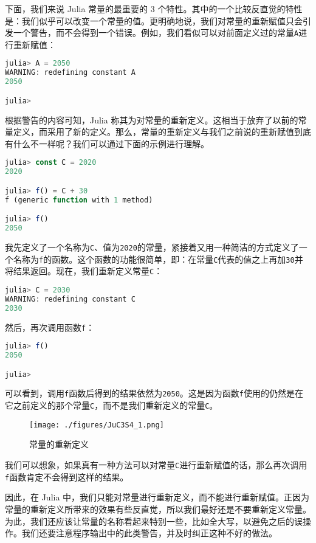 下面，我们来说 Julia 常量的最重要的 3 个特性。其中的一个比较反直觉的特性是：我们似乎可以改变一个常量的值。更明确地说，我们对常量的重新赋值只会引发一个警告，而不会得到一个错误。例如，我们看似可以对前面定义过的常量\verb|A|进行重新赋值：

\begin{lstlisting}[language=julia]
julia> A = 2050
WARNING: redefining constant A
2050

julia> 
\end{lstlisting}

根据警告的内容可知，Julia 称其为对常量的重新定义。这相当于放弃了以前的常量定义，而采用了新的定义。那么，常量的重新定义与我们之前说的重新赋值到底有什么不一样呢？我们可以通过下面的示例进行理解。

\begin{lstlisting}[language=julia]
julia> const C = 2020 
2020

julia> f() = C + 30
f (generic function with 1 method)

julia> f()
2050
\end{lstlisting}

我先定义了一个名称为\verb|C|、值为\verb|2020|的常量，紧接着又用一种简洁的方式定义了一个名称为\verb|f|的函数。这个函数的功能很简单，即：在常量\verb|C|代表的值之上再加\verb|30|并将结果返回。现在，我们重新定义常量\verb|C|：

\begin{lstlisting}[language=julia]
julia> C = 2030
WARNING: redefining constant C
2030
\end{lstlisting}

然后，再次调用函数\verb|f|：

\begin{lstlisting}[language=julia]
julia> f()
2050

julia> 
\end{lstlisting}

可以看到，调用\verb|f|函数后得到的结果依然为\verb|2050|。这是因为函数\verb|f|使用的仍然是在它之前定义的那个常量\verb|C|，而不是我们重新定义的常量\verb|C|。

\begin{figure}[ht]
\centering
\texttt{[image: ./figures/JuC3S4\_1.png]}
\caption{常量的重新定义} \label{JuC3S4_fig1}
\end{figure}

我们可以想象，如果真有一种方法可以对常量\verb|C|进行重新赋值的话，那么再次调用\verb|f|函数肯定不会得到这样的结果。

因此，在 Julia 中，我们只能对常量进行重新定义，而不能进行重新赋值。正因为常量的重新定义所带来的效果有些反直觉，所以我们最好还是不要重新定义常量。为此，我们还应该让常量的名称看起来特别一些，比如全大写，以避免之后的误操作。我们还要注意程序输出中的此类警告，并及时纠正这种不好的做法。

